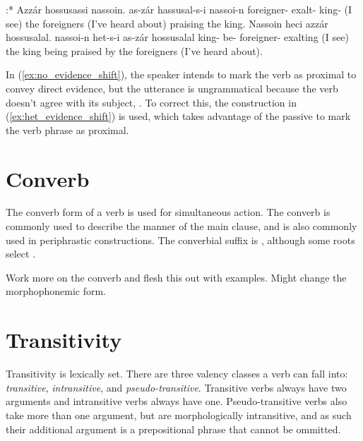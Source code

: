 \begin{examples*}
	\ex \label{ex:no_evidence_shift}
		\script:* Azzár hossusassi nassoin.
		\bits as-zár hassusal-s-i nassoi-n
		\gloss foreigner- exalt- king-
		\intended (I see) the foreigners (I've heard about) praising the king.
	\ex \label{ex:het_evidence_shift}
		\script Nassoin heci azzár hossusalal.
		\bits nassoi-n het-s-i as-zár hossusalal
		\gloss king- be- foreigner- exalting
		\tr (I see) the king being praised by the foreigners (I've heard about).
\end{examples*}

In (\ref{ex:no_evidence_shift}), the speaker intends to mark the verb as proximal to convey direct evidence, but the utterance is ungrammatical because the verb doesn't agree with its subject, . To correct this, the construction in (\ref{ex:het_evidence_shift}) is used, which takes advantage of the passive to mark the verb phrase as proximal.

\section{Converb}
The converb form of a verb is used for simultaneous action. The converb is commonly used to describe the manner of the main clause, and is also commonly used in periphrastic constructions. The converbial suffix is , although some roots select .

\begin{kaobox}[frametitle=\sc todo:]
	Work more on the converb and flesh this out with examples. Might change the morphophonemic form.
\end{kaobox}

\section{Transitivity}
Transitivity is lexically set. There are three valency classes a verb can fall into: \emph{transitive}, \emph{intransitive}, and \emph{pseudo-transitive}. Transitive verbs always have two arguments and intransitive verbs always have one. Pseudo-transitive verbs also take more than one argument, but are morphologically intransitive, and as such their additional argument is a prepositional phrase that cannot be ommitted. 

